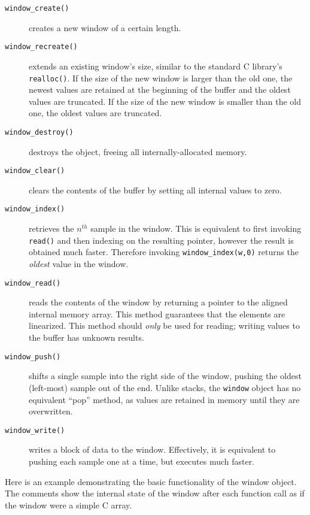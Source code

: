 \begin{description}
\item[{\tt window\_create()}]
    creates a new window of a certain length.
\item[{\tt window\_recreate()}]
    extends an existing window's size, similar to the standard C library's
    {\tt realloc()}.
    If the size of the new window is larger than the old one, the newest
    values are retained at the beginning of the buffer and the oldest values
    are truncated.
    If the size of the new window is smaller than the old one, the oldest
    values are truncated.
\item[{\tt window\_destroy()}]
    destroys the object, freeing all internally-allocated memory.
\item[{\tt window\_clear()}]
    clears the contents of the buffer by setting all internal values to zero.
\item[{\tt window\_index()}]
    retrieves the $n^{th}$ sample in the window.
    This is equivalent to first invoking {\tt read()} and then indexing on the
    resulting pointer, however the result is obtained much faster.
    Therefore invoking {\tt window\_index(w,0)} returns the {\em oldest} value
    in the window.
\item[{\tt window\_read()}]
    reads the contents of the window by returning a pointer to the aligned
    internal memory array.
    This method guarantees that the elements are linearized.
    This method should {\em only} be used for reading; writing values to the
    buffer has unknown results.
\item[{\tt window\_push()}]
    shifts a single sample into the right side of the window, pushing the
    oldest (left-most) sample out of the end.
    Unlike stacks, the {\tt window} object has no equivalent ``pop'' method,
    as values are retained in memory until they are overwritten.
\item[{\tt window\_write()}]
    writes a block of data to the window.
    Effectively, it is equivalent to pushing each sample one at a time, but
    executes much faster.
\end{description}

Here is an example demonstrating the basic functionality of the window object.
The comments show the internal state of the window after each function call as
if the window were a simple C array.



